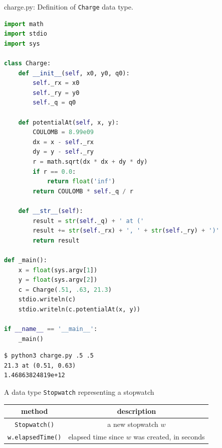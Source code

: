 \documentclass[8pt,a4paper,compress]{beamer}
\begin{document}
\begin{frame}[fragile]
\pause

\begin{framed}
\tiny charge.py: Definition of \lstinline{Charge} data type. 
\end{framed}

\begin{lstlisting}[language=python,style=focusin]
import math
import stdio
import sys

class Charge:
    def __init__(self, x0, y0, q0):
        self._rx = x0
        self._ry = y0
        self._q = q0

    def potentialAt(self, x, y):
        COULOMB = 8.99e09
        dx = x - self._rx
        dy = y - self._ry
        r = math.sqrt(dx * dx + dy * dy)
        if r == 0.0:
            return float('inf')
        return COULOMB * self._q / r

    def __str__(self):
        result = str(self._q) + ' at ('
        result += str(self._rx) + ', ' + str(self._ry) + ')'
        return result

def _main():
    x = float(sys.argv[1])
    y = float(sys.argv[2])
    c = Charge(.51, .63, 21.3)
    stdio.writeln(c)
    stdio.writeln(c.potentialAt(x, y))

if __name__ == '__main__':
    _main()
\end{lstlisting}

\pause
\bigskip

\begin{lstlisting}[language={},style=focusin]
$ python3 charge.py .5 .5
21.3 at (0.51, 0.63)
1.46863824819e+12
\end{lstlisting}
\end{frame}

\begin{frame}[fragile]
\pause

A data type \lstinline{Stopwatch} representing a stopwatch
\begin{center}
\begin{tabular}{cc}
method & description \\ \hline
\lstinline$Stopwatch()$ & a new stopwatch $w$ \\
\lstinline$w.elapsedTime()$ & elapsed time since $w$ was created, in seconds
\end{tabular} 
\end{center}
\end{frame}
\end{document}
